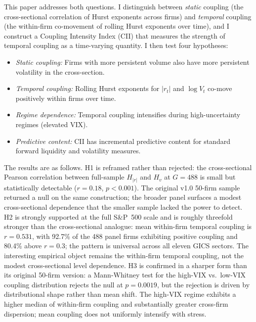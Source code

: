 \documentclass[preprint,12pt,authoryear]{elsarticle}
\begin{document}
This paper addresses both questions. I distinguish between \emph{static} coupling (the cross-sectional correlation of Hurst exponents across firms) and \emph{temporal} coupling (the within-firm co-movement of rolling Hurst exponents over time), and I construct a Coupling Intensity Index (CII) that measures the strength of temporal coupling as a time-varying quantity. I then test four hypotheses:

\begin{itemize}
\item[\textbf{H1}] \emph{Static coupling:} Firms with more persistent volume also have more persistent volatility in the cross-section.
\item[\textbf{H2}] \emph{Temporal coupling:} Rolling Hurst exponents for $|r_t|$ and $\log V_t$ co-move positively within firms over time.
\item[\textbf{H3}] \emph{Regime dependence:} Temporal coupling intensifies during high-uncertainty regimes (elevated VIX).
\item[\textbf{H4}] \emph{Predictive content:} CII has incremental predictive content for standard forward liquidity and volatility measures.
\end{itemize}

The results are as follows. H1 is reframed rather than rejected: the cross-sectional Pearson correlation between full-sample $H_{|r|}$ and $H_v$ at $G = 488$ is small but statistically detectable ($r = 0.18$, $p < 0.001$). The original v1.0 50-firm sample returned a null on the same construction; the broader panel surfaces a modest cross-sectional dependence that the smaller sample lacked the power to detect. H2 is strongly supported at the full S\&P~500 scale and is roughly threefold stronger than the cross-sectional analogue: mean within-firm temporal coupling is $r = 0.531$, with 92.7\% of the 488 panel firms exhibiting positive coupling and 80.4\% above $r = 0.3$; the pattern is universal across all eleven GICS sectors. The interesting empirical object remains the within-firm temporal coupling, not the modest cross-sectional level dependence. H3 is confirmed in a sharper form than its original 50-firm version: a Mann-Whitney test for the high-VIX vs.\ low-VIX coupling distribution rejects the null at $p = 0.0019$, but the rejection is driven by distributional shape rather than mean shift. The high-VIX regime exhibits a higher median of within-firm coupling and substantially greater cross-firm dispersion; mean coupling does not uniformly intensify with stress.
\end{document}
